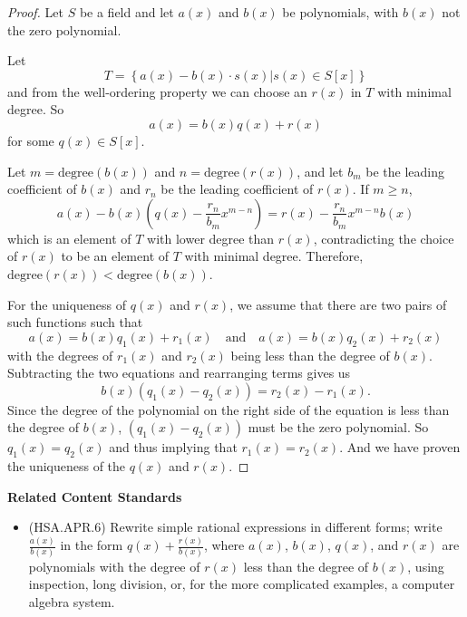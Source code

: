 \documentclass[
]{book}
\providecommand{\tightlist}{%
  \setlength{\itemsep}{0pt}\setlength{\parskip}{0pt}}
\newenvironment{standards}{}{}
\theoremstyle{definition}
\theoremstyle{definition}
\theoremstyle{definition}
\theoremstyle{definition}
\theoremstyle{remark}
\begin{document}
\begin{proof}
Let \(S\) be a field and let \(a(x)\) and \(b(x)\) be polynomials, with \(b(x)\) not the zero polynomial.

Let
\[T= \left\{ a(x)-b(x)\cdot s(x) | s(x) \in S[x]\right\}\] and from the well-ordering property we can choose an \(r(x)\) in \(T\) with minimal degree. So \[a(x)=b(x) q(x) + r(x)\] for some \(q(x)\in S[x]\).

Let \(m=\mathrm{degree}(b(x))\) and \(n=\mathrm{degree}(r(x))\), and let \(b_m\) be the leading coefficient of \(b(x)\) and \(r_n\) be the leading coefficient of \(r(x)\). If \(m\geq n\),
\[a(x)-b(x)\left(q(x)- \frac{r_n}{b_m} x^{m-n}\right)= r(x)-\frac{r_n}{b_m} x^{m-n} b(x) \] which is an element of \(T\) with lower degree than \(r(x)\), contradicting the choice of \(r(x)\) to be an element of \(T\) with minimal degree. Therefore, \(\mathrm{degree}(r(x))<\mathrm{degree}(b(x))\).

For the uniqueness of \(q(x)\) and \(r(x)\), we assume that there are two pairs of such functions such that
\[a(x)=b(x) q_1(x)+r_1(x) \quad \mbox{and} \quad a(x)=b(x) q_2(x)+r_2(x)\] with the degrees of \(r_1(x)\) and \(r_2(x)\) being less than the degree of \(b(x)\). Subtracting the two equations and rearranging terms gives us \[b(x) \left( q_1(x)-q_2(x) \right) = r_2(x)-r_1(x).\] Since the degree of the polynomial on the right side of the equation is less than the degree of \(b(x)\), \((q_1(x)-q_2(x))\) must be the zero polynomial. So \(q_1(x)= q_2(x)\) and thus implying that \(r_1(x)=r_2(x)\). And we have proven the uniqueness of the \(q(x)\) and \(r(x)\).
\end{proof}

\begin{standards}

\begin{center}
\textbf{Related Content Standards}

\end{center}

\begin{itemize}
\tightlist
\item
  (HSA.APR.6) Rewrite simple rational expressions in different forms; write \(\frac{a(x)}{b(x)}\) in the form \(q(x)+\frac{r(x)}{b(x)}\), where \(a(x)\), \(b(x)\), \(q(x)\), and \(r(x)\) are polynomials with the degree of \(r(x)\) less than the degree of \(b(x)\), using inspection, long division, or, for the more complicated examples, a computer algebra system.
\end{itemize}

\end{standards}
\end{document}
